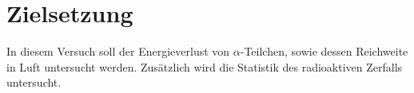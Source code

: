 \section{Zielsetzung}

\label{sec:Zielsetzung}

In diesem Versuch soll der Energieverlust von $\alpha$-Teilchen, sowie dessen Reichweite in Luft untersucht werden. Zusätzlich
wird die Statistik des radioaktiven Zerfalls untersucht.
